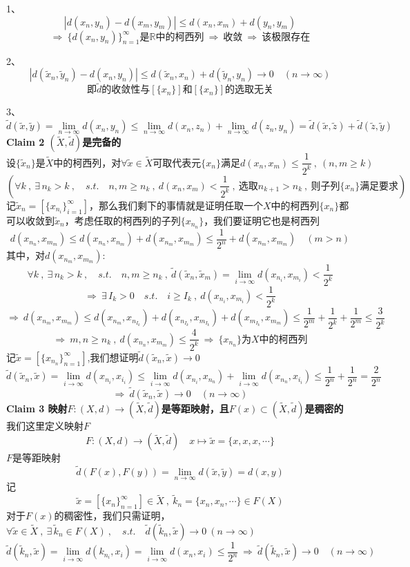 1、
\[|d(x_n,y_n)-d(x_m,y_m)| \leq d(x_n,x_m)+d(y_n,y_m)\]
\[\Rightarrow \ \{d(x_n,y_n)\}_{n=1}^{\infty}\text{是}\mathbb{R}\text{中的柯西列} \ \Rightarrow \ \text{收敛} \ \Rightarrow \ \text{该极限存在}\]

2、
\[|d(\tilde{x}_n,\tilde{y}_n)-d(x_n,y_n)| \leq d(\tilde{x}_n,x_n)+d(\tilde{y}_n,y_n)\to 0 \quad (n \to \infty)\]
\[\text{即$\tilde{d}$的收敛性与$[\{x_n\}]$和$[\{x_n\}]$的选取无关}\]

3、
\[\tilde{d}(\tilde{x},\tilde{y})=\lim_{n \to \infty}d(x_n,y_n) \leq \lim_{n \to \infty}d(x_n,z_n)+\lim_{n \to \infty}d(z_n,y_n)=\tilde{d}(\tilde{x},\tilde{z})+\tilde{d}(\tilde{z},\tilde{y})\]
\textbf{Claim 2 $(\tilde{X},\tilde{d})$是完备的}\\
\[\text{设}\{\tilde{x}_n\}\text{是}\tilde{X}\text{中的柯西列，对}\forall \tilde{x} \in \tilde{X}\text{可取代表元}\{x_n\}\text{满足}d(x_n,x_m)\leq \frac{1}{2^k} \ , \ (n,m \geq k)\]
\[(\forall k \ , \ \exists \, n_k>k \ , \quad s.t. \quad n,m \geq n_k \ , \ d(x_n,x_m)<\frac{1}{2^k} \ , \ \text{选取}n_{k+1}>n_k \ , \ \text{则子列}\{x_n\}\text{满足要求})\]
记$\tilde{x}_n=[\{x_{n_i}\}_{i=1}^{\infty}]$，那么我们剩下的事情就是证明任取一个$X$中的柯西列$\{x_n\}$都可以收敛到$\tilde{x}_n$，考虑任取的柯西列的子列$\{x_{n_n}\}$，我们要证明它也是柯西列
\[d(x_{n_n},x_{m_m}) \leq d(x_{n_n},x_{n_m})+d(x_{n_m},x_{m_m}) \leq \frac{1}{2^n}+d(x_{n_m},x_{m_m}) \quad (m>n)\]
其中，对$d(x_{n_m},x_{m_m})$:
\[\forall k \ , \ \exists \, n_k>k \ , \quad s.t. \quad n,m \geq n_k \ , \ \tilde{d}(\tilde{x}_n,\tilde{x}_m)=\lim_{i \to \infty}d(x_{n_i},x_{m_i})<\frac{1}{2^k}\]
\[\Rightarrow \ \exists \, I_k>0 \quad s.t. \quad i \geq I_k \ , \ d(x_{n_i},x_{m_i})<\frac{1}{2^k}\]
\[\Rightarrow \ d(x_{n_m},x_{m_m}) \leq d(x_{n_m},x_{n_{I_k}})+d(x_{n_{I_k}},x_{m_{I_k}})+d(x_{m_{I_k}},x_{m_m}) \leq \frac{1}{2^m}+\frac{1}{2^k}+\frac{1}{2^m} \leq \frac{3}{2^k}\]
\[\Rightarrow \ m,n \geq n_k \ , \ d(x_{n_n},x_{m_m}) \leq \frac{4}{2^k} \ \Rightarrow \ \{x_{n_n}\}\text{为}X\text{中的柯西列}\]
记$\tilde{x}=[\{x_{n_n}\}_{n=1}^{\infty}]$,我们想证明$\tilde{d}(\tilde{x}_n,\tilde{x}) \to 0$
\[\tilde{d}(\tilde{x}_n,\tilde{x})=\lim_{i \to \infty}d(x_{n_i},x_{i_i}) \leq \lim_{i \to \infty}d(x_{n_i},x_{n_n})+\lim_{i \to \infty}d(x_{n_n},x_{i_i}) \leq \frac{1}{2^n}+\frac{1}{2^n}=\frac{2}{2^n}\]
\[\Rightarrow \ \tilde{d}(\tilde{x}_n,\tilde{x}) \to 0 \quad (n \to \infty)\]
\textbf{Claim 3 映射$F:(X,d) \rightarrow (\tilde{X},\tilde{d})$是等距映射，且$F(x) \subset (\tilde{X},\tilde{d})$是稠密的}\\
我们这里定义映射$F$
\[F:(X,d) \to (\tilde{X},\tilde{d}) \quad x \mapsto \tilde{x}=\{x,x,x,\cdots\}\]
$F$是等距映射
\[\tilde{d}(F(x),F(y))=\lim_{n \to \infty}d(\tilde{x},\tilde{y})=d(x,y)\]
记
\[\tilde{x}=[\{x_n\}_{n=1}^{\infty}] \in \tilde{X} \ , \ \tilde{k}_n=\{x_n,x_n,\cdots\} \in F(X)\]
对于$F(x)$的稠密性，我们只需证明，$\forall \tilde{x} \in \tilde{X} \ , \ \exists \, \tilde{k}_n \in F(X) \ , \quad s.t. \quad \tilde{d}(\tilde{k}_n,\tilde{x}) \to 0 \ (n \to \infty)$
\[\tilde{d}(\tilde{k}_n,\tilde{x})=\lim_{i \to \infty}d(k_{n_i},x_i)=\lim_{i \to \infty}d(x_n,x_i) \leq \frac{1}{2^n} \ \Rightarrow \ \tilde{d}(\tilde{k}_n,\tilde{x}) \to 0 \quad (n \to \infty)\]

